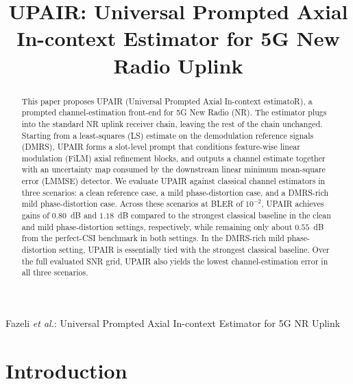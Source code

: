 \documentclass[conference,letterpaper]{IEEEtran}
\begin{document}
	\title{UPAIR: Universal Prompted Axial In-context Estimator
		for 5G New Radio Uplink}
	\author{
	}
	
	\markboth{}%
	{Fazeli \MakeLowercase{\textit{et al.}}: Universal Prompted Axial In-context Estimator for 5G NR Uplink}
	
	\maketitle
	
	\begin{abstract}
		This paper proposes UPAIR (Universal Prompted Axial In-context estimatoR), a prompted channel-estimation front-end for 5G New Radio (NR). The estimator plugs into the standard NR uplink receiver chain, leaving the rest of the chain unchanged. Starting from a least-squares (LS) estimate on the demodulation reference signals (DMRS), UPAIR forms a slot-level prompt that conditions feature-wise linear modulation (FiLM) axial refinement blocks, and outputs a channel estimate together with an uncertainty map consumed by the downstream linear minimum mean-square error (LMMSE) detector.
		We evaluate UPAIR against classical channel estimators in three scenarios: a clean reference case, a mild phase-distortion case, and a DMRS-rich mild phase-distortion case.
		Across these scenarios at BLER of $10^{-2}$, UPAIR achieves gains of $0.80$~dB and $1.18$~dB compared to the strongest classical baseline in the clean and mild phase-distortion settings, respectively, while remaining only about $0.55$~dB from the perfect-CSI benchmark in both settings. In the DMRS-rich mild phase-distortion setting, UPAIR is essentially tied with the strongest classical baseline. Over the full evaluated SNR grid, UPAIR also yields the lowest channel-estimation error in all three scenarios.
		
	\end{abstract}
	
	\section{Introduction}
	\label{sec:introduction}
	
\end{document}
